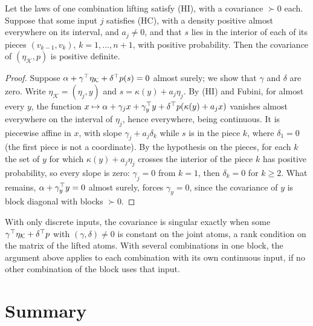 \documentclass[11pt,a4paper]{article}
\numberwithin{equation}{section}
\newcommand{\Hyp}[1]{\textup{(H#1)}}    %
\begin{document}
\begin{proposition}
\label{prop:nonsingular}
Let the laws of one combination lifting satisfy \Hyp{I}, with a covariance $\succ 0$ each.
Suppose that some input $j$ satisfies \Hyp{C}, with a density positive almost everywhere on its interval, and $a_j \ne 0$,
and that $s$ lies in the interior of each of its pieces $(v_{k-1}, v_k)$, $k = 1, \dots, n + 1$, with positive probability.
Then the covariance of $(\eta_{\mathcal{K}}, p)$ is positive definite.
\end{proposition}

\begin{proof}
Suppose $\alpha + \gamma^\top\eta_{\mathcal{K}} + \delta^\top p(s) = 0$ almost surely; we show that $\gamma$ and $\delta$ are zero.
Write $\eta_{\mathcal{K}} = (\eta_j, y)$ and $s = \kappa(y) + a_j\eta_j$.
By \Hyp{I} and Fubini, for almost every $y$, the function $x \mapsto \alpha + \gamma_j x + \gamma_y^\top y + \delta^\top p(\kappa(y) + a_jx)$ vanishes almost everywhere on the interval of $\eta_j$, hence everywhere, being continuous.
It is piecewise affine in $x$, with slope $\gamma_j + a_j\delta_k$ while $s$ is in the piece $k$, where $\delta_1 = 0$ (the first piece is not a coordinate).
By the hypothesis on the pieces, for each $k$ the set of $y$ for which $\kappa(y) + a_j\eta_j$ crosses the interior of the piece $k$ has positive probability,
so every slope is zero: $\gamma_j = 0$ from $k = 1$, then $\delta_k = 0$ for $k \ge 2$.
What remains, $\alpha + \gamma_y^\top y = 0$ almost surely, forces $\gamma_y = 0$, since the covariance of $y$ is block diagonal with blocks $\succ 0$.
\end{proof}

With only discrete inputs, the covariance is singular exactly when some $\gamma^\top\eta_{\mathcal{K}} + \delta^\top p$ with $(\gamma, \delta) \ne 0$ is constant on the joint atoms, a rank condition on the matrix of the lifted atoms.
With several combinations in one block, the argument above applies to each combination with its own continuous input, if no other combination of the block uses that input.

\section{Summary}
\label{sec:summary}
\end{document}
